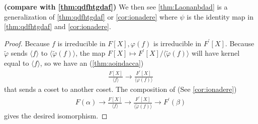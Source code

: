 \documentclass{article}
\newcommand{\bfs}[1]{\textbf{({#1}) }}
\begin{document}
\begin{rema}\bfs{compare with \cref{thm:qdfhtgdaf}}
We then see \cref{thm:Laonanbdad} is a generalization of \cref{thm:qdfhtgdaf} or \cref{cor:ionadere} where $\psi$ is the identity map in \cref{thm:qdfhtgdaf} and \cref{cor:ionadere}.
\end{rema}
\begin{proof}
Because $f$ is irreducible in $F[X], \varphi(f)$ is irreducible in $F^{\prime}[X]$. Because $\tilde{\varphi}$ sends $\langle f\rangle$ to $\langle\tilde{\varphi}(f)\rangle$, the map $F[X] \mapsto F^{\prime}[X] /\langle\tilde{\varphi}(f)\rangle$ will have kernel equal to $\langle f\rangle$, so we have an  (\cref{thm:aoindacca})
\begin{align*}
\frac{F[X]}{\langle f\rangle} \rightarrow \frac{F^{\prime}[X]}{\langle\varphi(f)\rangle}
\end{align*}
that sends a coset to another coset. The composition of  (See \cref{cor:ionadere})
\begin{align*}
F(\alpha) \rightarrow \frac{F[X]}{\langle f\rangle} \rightarrow \frac{F^{\prime}[X]}{\langle\tilde{\varphi}(f)\rangle} \rightarrow F^{\prime}(\beta)
\end{align*}
gives the desired isomorphism.
\end{proof}
\end{document}
